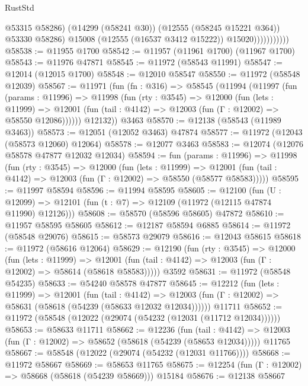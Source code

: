\begin{lexlean}{RustStd}
\begin{coremodule}
                              @53315
                              @58286)
                            (@14299 (@58241 @30))
                            (@12555 (@58245 @15221 @364))
                            @53330
                            @58286)
                          @15008
                          (@12555 (@16537 @3412 @15222))
                          @15020)))))))))))
@58538 := @11955 @1700
@58542 := @11957 (@11961 @1700) (@11967 @1700)
@58543 := @11976 @47871
@58545 := @11972 (@58543 @11991)
@58547 := @12014 (@12015 @1700)
@58548 := @12010 @58547
@58550 := @11972 (@58548 @12039)
@58567 := @11971
    (fun (fn : @316) =>
    @58545
      (@11994
        (@11997
          (fun (params : @11996) =>
          @11998
            (fun (rty : @3545) =>
            @12000
              (fun (lets : @11999) =>
              @12001 (fun (tail : @4142) => @12003 (fun (Γ : @12002) => @58550 @12086))))))
        @12132))
    @3463
@58570 := @12138 (@58543 (@11989 @3463))
@58573 := @12051 (@12052 @3463) @47874
@58577 := @11972 (@12043 (@58573 @12060) @12064)
@58578 := @12077 @3463
@58583 := @12074 (@12076 @58578 @47877 @12032 @12034)
@58594 := fun (params : @11996) =>
  @11998
    (fun (rty : @3545) =>
    @12000
      (fun (lets : @11999) =>
      @12001 (fun (tail : @4142) => @12003 (fun (Γ : @12002) => @58550 (@58577 @58583)))))
@58595 := @11997 @58594
@58596 := @11994 @58595
@58605 := @12100
    (fun (U : @12099) => @12101 (fun (t : @7) => @12109 (@11972 (@12115 @47874 @11990) @12126)))
@58608 := @58570 (@58596 @58605) @47872
@58610 := @11957 @58595 @58605
@58612 := @12187 @58594 @6885
@58614 := @11972 (@58548 @29076)
@58615 := @58573 @29079
@58616 := @12043 @58615
@58618 := @11972 (@58616 @12064)
@58629 := @12190
    (fun (rty : @3545) =>
    @12000
      (fun (lets : @11999) =>
      @12001 (fun (tail : @4142) => @12003 (fun (Γ : @12002) => @58614 (@58618 @58583)))))
    @3592
@58631 := @11972 (@58548 @54235)
@58633 := @54240 @58578 @47877
@58645 := @12212
    (fun (lets : @11999) =>
    @12001
      (fun (tail : @4142) =>
      @12003 (fun (Γ : @12002) => @58631 (@58618 (@54239 (@58633 @12032 @12034))))))
    @11711
@58652 := @11972 (@58548 (@12022 (@29074 (@54232 (@12031 (@11712 @12034))))))
@58653 := @58633 @11711
@58662 := @12236
    (fun (tail : @4142) => @12003 (fun (Γ : @12002) => @58652 (@58618 (@54239 (@58653 @12034)))))
    @11765
@58667 := @58548 (@12022 (@29074 (@54232 (@12031 @11766))))
@58668 := @11972 @58667
@58669 := @58653 @11765
@58675 := @12254 (fun (Γ : @12002) => @58668 (@58618 (@54239 @58669))) @15184
@58676 := @12138 @58667

\end{coremodule}
\end{lexlean}
